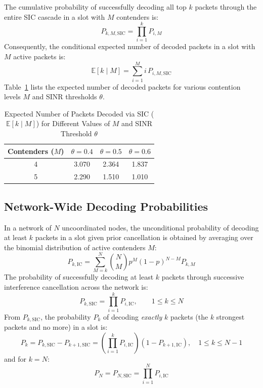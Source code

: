 The cumulative probability of successfully decoding all top $k$ packets through the entire SIC cascade in a slot with $M$ contenders is:
\begin{equation}
    P_{k,M,\text{SIC}} = \prod_{i=1}^k P_{i,M}
\end{equation}
Consequently, the conditional expected number of decoded packets in a slot with $M$ active packets is:
\begin{equation}
    \mathbb{E}[k \mid M] = \sum_{i=1}^M i \, P_{i,M,\text{SIC}}
\end{equation}
Table~\ref{tab:sic_expected_packets} lists the expected number of decoded packets for various contention levels $M$ and SINR thresholds $\theta$.

\begin{table}[htbp]
\centering
\caption{Expected Number of Packets Decoded via SIC ($\mathbb{E}[k \mid M]$) for Different Values of $M$ and SINR Threshold $\theta$}
\label{tab:sic_expected_packets}
\begin{tabular}{cccc}
\toprule
\textbf{Contenders ($M$)} & $\theta = 0.4$ & $\theta = 0.5$ & $\theta = 0.6$ \\
\midrule
4 & 3.070 & 2.364 & 1.837 \\
5 & 2.290 & 1.510 & 1.010 \\
\bottomrule
\end{tabular}
\end{table}

\subsection{Network-Wide Decoding Probabilities}
In a network of $N$ uncoordinated nodes, the unconditional probability of decoding at least $k$ packets in a slot given prior cancellation is obtained by averaging over the binomial distribution of active contenders $M$:
\begin{equation}
    P_{k,\text{IC}} = \sum_{M=k}^N \binom{N}{M} p^M (1 - p)^{N - M} P_{k,M}
\end{equation}
The probability of successfully decoding at least $k$ packets through successive interference cancellation across the network is:
\begin{equation}
    P_{k,\text{SIC}} = \prod_{i=1}^k P_{i,\text{IC}}, \qquad 1 \le k \le N
\end{equation}
From $P_{k,\text{SIC}}$, the probability $P_k$ of decoding \emph{exactly} $k$ packets (the $k$ strongest packets and no more) in a slot is:
\begin{equation}
    P_k = P_{k,\text{SIC}} - P_{k+1,\text{SIC}} = \left( \prod_{i=1}^k P_{i,\text{IC}} \right) (1 - P_{k+1,\text{IC}}), \quad 1 \le k \le N - 1
\end{equation}
and for $k = N$:
\begin{equation}
    P_N = P_{N,\text{SIC}} = \prod_{i=1}^N P_{i,\text{IC}}
\end{equation}

